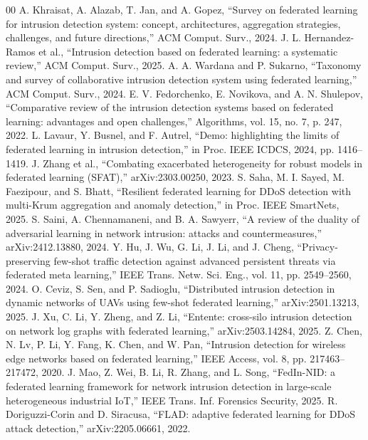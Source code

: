 \documentclass[conference]{IEEEtran}
\begin{document}
\begin{thebibliography}{00}
 A. Khraisat, A. Alazab, T. Jan, and A. Gopez, ``Survey on federated learning for intrusion detection system: concept, architectures, aggregation strategies, challenges, and future directions,'' ACM Comput. Surv., 2024.
 J. L. Hernandez-Ramos et al., ``Intrusion detection based on federated learning: a systematic review,'' ACM Comput. Surv., 2025.
 A. A. Wardana and P. Sukarno, ``Taxonomy and survey of collaborative intrusion detection system using federated learning,'' ACM Comput. Surv., 2024.
 E. V. Fedorchenko, E. Novikova, and A. N. Shulepov, ``Comparative review of the intrusion detection systems based on federated learning: advantages and open challenges,'' Algorithms, vol. 15, no. 7, p. 247, 2022.
 L. Lavaur, Y. Busnel, and F. Autrel, ``Demo: highlighting the limits of federated learning in intrusion detection,'' in Proc. IEEE ICDCS, 2024, pp. 1416--1419.
 J. Zhang et al., ``Combating exacerbated heterogeneity for robust models in federated learning (SFAT),'' arXiv:2303.00250, 2023.
 S. Saha, M. I. Sayed, M. Faezipour, and S. Bhatt, ``Resilient federated learning for DDoS detection with multi-Krum aggregation and anomaly detection,'' in Proc. IEEE SmartNets, 2025.
 S. Saini, A. Chennamaneni, and B. A. Sawyerr, ``A review of the duality of adversarial learning in network intrusion: attacks and countermeasures,'' arXiv:2412.13880, 2024.
 Y. Hu, J. Wu, G. Li, J. Li, and J. Cheng, ``Privacy-preserving few-shot traffic detection against advanced persistent threats via federated meta learning,'' IEEE Trans. Netw. Sci. Eng., vol. 11, pp. 2549--2560, 2024.
 O. Ceviz, S. Sen, and P. Sadioglu, ``Distributed intrusion detection in dynamic networks of UAVs using few-shot federated learning,'' arXiv:2501.13213, 2025.
 J. Xu, C. Li, Y. Zheng, and Z. Li, ``Entente: cross-silo intrusion detection on network log graphs with federated learning,'' arXiv:2503.14284, 2025.
 Z. Chen, N. Lv, P. Li, Y. Fang, K. Chen, and W. Pan, ``Intrusion detection for wireless edge networks based on federated learning,'' IEEE Access, vol. 8, pp. 217463--217472, 2020.
 J. Mao, Z. Wei, B. Li, R. Zhang, and L. Song, ``FedIn-NID: a federated learning framework for network intrusion detection in large-scale heterogeneous industrial IoT,'' IEEE Trans. Inf. Forensics Security, 2025.
 R. Doriguzzi-Corin and D. Siracusa, ``FLAD: adaptive federated learning for DDoS attack detection,'' arXiv:2205.06661, 2022.

\end{thebibliography}
\end{document}
